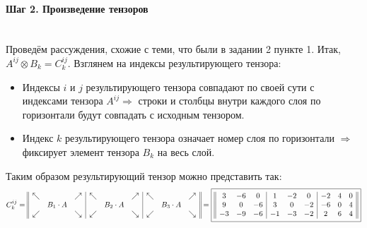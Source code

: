 \documentclass{article}
\newcommand*\squared[1]{\tikz[baseline=(char.base)]{
            \node[shape=rectangle,draw,inner sep=4pt] (char) {#1};}}
\begin{document}
\paragraph*{Шаг 2. Произведение тензоров} \, \\
Проведём рассуждения, схожие с теми, что были в задании 2 пункте 1. Итак, $A^{ij} \otimes B_{k} = C^{ij}_{k}$. Взглянем на индексы результирующего тензора:
\begin{itemize}
\item Индексы $i$ и $j$ результирующего тензора совпадают по своей сути с индексами тензора $A^{ij} \Rightarrow$ строки и столбцы внутри каждого слоя по горизонтали будут совпадать с исходным тензором.
\item Индекс $k$ результирующего тензора означает номер слоя по горизонтали $\Rightarrow$ фиксирует элемент тензора $B_{k}$ на весь слой.
\end{itemize}
Таким образом результирующий тензор можно представить так:
$$C^{ij}_{k} = \begin{array}{||ccc|ccc|ccc||}
\nwarrow & & \nearrow & \nwarrow & & \nearrow & \nwarrow & & \nearrow \\
& B_1 \cdot A & & & B_2 \cdot A & & & B_3 \cdot A & \\
\swarrow & & \searrow & \swarrow & & \searrow & \swarrow & & \searrow \\
\end{array} = \squared{$\begin{array}{||ccc|ccc|ccc||}
3 & -6 & 0 & 1 & -2 & 0 & -2 & 4 & 0 \\
9 & 0 & -6 & 3 & 0 & -2 & -6 & 0 & 4 \\
-3 & -9 & -6 & -1 & -3 & -2 & 2 & 6 & 4
\end{array}$}$$
\end{document}
